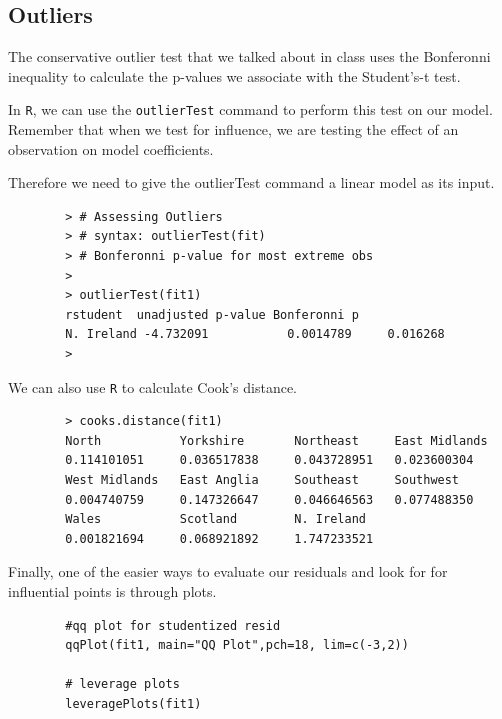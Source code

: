 \documentclass[main.tex]{subfiles}
\begin{document}
	\bigskip
	\subsection*{Outliers}
	
	
	
	
	The conservative outlier test that we talked about in class uses the
	Bonferonni inequality to calculate the p-values we associate with the
	Student's-t test. 
	
	In \texttt{R}, we can use the \texttt{outlierTest} command to perform this
	test on our model. Remember that when we test for influence, we are testing
	the effect of an observation on model coefficients. 
	
	Therefore we need to
	give the outlierTest command a linear model as its input.
	\begin{framed}
		\begin{verbatim}
		> # Assessing Outliers
		> # syntax: outlierTest(fit) 
		> # Bonferonni p-value for most extreme obs
		>
		> outlierTest(fit1)
		rstudent  unadjusted p-value Bonferonni p
		N. Ireland -4.732091           0.0014789     0.016268
		> 
		\end{verbatim}
	\end{framed}
	\noindent We can also use \texttt{R} to calculate Cook's distance. 
	\begin{framed}
		\begin{verbatim}
		> cooks.distance(fit1)
		North           Yorkshire       Northeast     East Midlands 
		0.114101051     0.036517838     0.043728951   0.023600304 
		West Midlands   East Anglia     Southeast     Southwest 
		0.004740759     0.147326647     0.046646563   0.077488350 
		Wales           Scotland        N. Ireland 
		0.001821694     0.068921892     1.747233521 
		\end{verbatim}
	\end{framed}
	
	Finally, one of the easier ways to evaluate our residuals and look for
	for influential points is through plots. 
	
	\begin{framed}
		\begin{verbatim}
		#qq plot for studentized resid 
		qqPlot(fit1, main="QQ Plot",pch=18, lim=c(-3,2)) 
		
		# leverage plots
		leveragePlots(fit1) 
		\end{verbatim}
	\end{framed}
	
\end{document}
